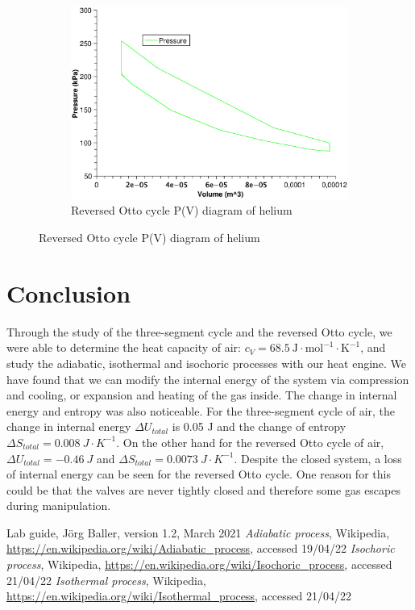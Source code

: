 \documentclass{scrartcl}
\begin{document}
\begin{figure}[!ht]
\begin{subfigure}[b]{0.3\textwidth}
     \end{subfigure}
     \hfill
     \begin{subfigure}[b]{0.3\textwidth}
         \centering
         \includegraphics[width=\textwidth]{Otto/PV_helium_Otto.eps}
         \caption{Reversed Otto cycle P(V) diagram of helium}
         \label{fig:Otto_helium}
     \end{subfigure}
\end{figure}
\FloatBarrier


\section{Conclusion}

Through the study of the three-segment cycle and the reversed Otto cycle, we were able to determine the heat capacity of air: $c_V = 68.5 \ \text{J} \cdot \text{mol}^{-1} \cdot \text{K}^{-1}$, and study the adiabatic, isothermal and isochoric processes with our heat engine. We have found that we can modify the internal energy of the system via compression and cooling, or expansion and heating of the gas inside. The change in internal energy and entropy was also noticeable. 
For the three-segment cycle of air, the change in internal energy $\Delta U_{total}$ is 0.05 J and the change of entropy $\Delta S_{total} = 0.008 \ J\cdot K^{-1}$. On the other hand for the reversed Otto cycle of air, $\Delta U_{total} = -0.46 \ J$ and $\Delta S_{total} = 0.0073 \ J\cdot K^{-1}$.
Despite the closed system, a loss of internal energy can be seen for the reversed Otto cycle. One reason for this could be that the valves are never tightly closed and therefore some gas escapes during manipulation.\\


\begin{thebibliography}{}
    \bibitem{} Lab guide, Jörg Baller, version 1.2, March 2021
     \textit{Adiabatic process}, Wikipedia,  \url{https://en.wikipedia.org/wiki/Adiabatic_process}, accessed 19/04/22
     \textit{Isochoric process}, Wikipedia, \url{https://en.wikipedia.org/wiki/Isochoric_process}, accessed 21/04/22
     \textit{Isothermal process}, Wikipedia, \url{https://en.wikipedia.org/wiki/Isothermal_process}, accessed 21/04/22
\end{thebibliography}
\end{document}
